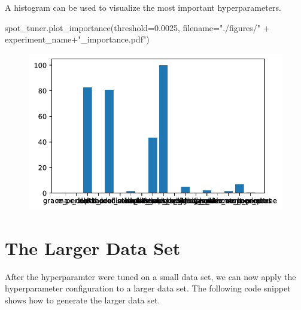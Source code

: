 \documentclass[
  letterpaper,
  DIV=11,
  numbers=noendperiod]{scrreprt}
\newenvironment{Shaded}{\begin{snugshade}}{\end{snugshade}}
\newcommand{\FloatTok}[1]{\textcolor[rgb]{0.68,0.00,0.00}{#1}}
\newcommand{\NormalTok}[1]{\textcolor[rgb]{0.00,0.23,0.31}{#1}}
\newcommand{\OperatorTok}[1]{\textcolor[rgb]{0.37,0.37,0.37}{#1}}
\newcommand{\StringTok}[1]{\textcolor[rgb]{0.13,0.47,0.30}{#1}}
\begin{document}
A histogram can be used to visualize the most important hyperparameters.

\begin{Shaded}
\begin{Highlighting}[]
\NormalTok{spot\_tuner.plot\_importance(threshold}\OperatorTok{=}\FloatTok{0.0025}\NormalTok{, filename}\OperatorTok{=}\StringTok{"./figures/"} \OperatorTok{+}\NormalTok{ experiment\_name}\OperatorTok{+}\StringTok{"\_importance.pdf"}\NormalTok{)}
\end{Highlighting}
\end{Shaded}

\begin{figure}[H]

{\centering \includegraphics{024_spot_hpt_river_friedman_hatr_files/figure-pdf/cell-23-output-1.pdf}

}

\end{figure}

\hypertarget{the-larger-data-set}{%
\section{The Larger Data Set}\label{the-larger-data-set}}

After the hyperparamter were tuned on a small data set, we can now apply
the hyperparameter configuration to a larger data set. The following
code snippet shows how to generate the larger data set.
\end{document}
